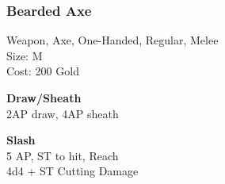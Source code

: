 \subsubsection{Bearded Axe}\label{weapon:beardedAxe}
Weapon, Axe, One-Handed, Regular, Melee\\
Size: M\\
Cost: 200 Gold

\textbf{Draw/Sheath}\\
2AP draw, 4AP sheath

\textbf{Slash}\\
5 AP, ST to hit,  Reach\\
4d4 + \texttimes ST Cutting Damage
